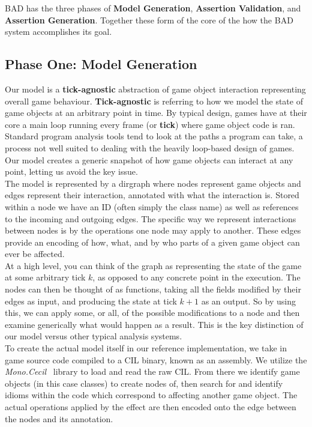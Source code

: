 \documentclass[letterpaper,twocolumn,10pt]{article}
\begin{document}
BAD has the three phases of \textbf{Model Generation}, \textbf{Assertion Validation}, and \textbf{Assertion Generation}. Together these form of the core of the how the BAD system accomplishes its goal. 

\subsection{Phase One: Model Generation}

Our model is a \textbf{tick-agnostic} abstraction of game object interaction representing overall game behaviour. \textbf{Tick-agnostic} is referring to how we model the state of game objects at an arbitrary point in time. By typical design, games have at their core a main loop running every frame (or \textbf{tick}) where game object code is ran. Standard program analysis tools tend to look at the paths a program can take, a process not well suited to dealing with the heavily loop-based design of games. Our model creates a generic snapshot of how game objects can interact at any point, letting us avoid the key issue. \\

The model is represented by a dirgraph where nodes represent game objects and edges represent their interaction, annotated with what the interaction is. Stored within a node we have an ID (often simply the class name) as well as references to the incoming and outgoing edges. The specific way we represent interactions between nodes is by the operations one node may apply to another. These edges provide an encoding of how, what, and by who parts of a given game object can ever be affected. \\

At a high level, you can think of the graph as representing the state of the game at some arbitrary tick $k$, as opposed to any concrete point in the execution. The nodes can then be thought of as functions, taking all the fields modified by their edges as input, and producing the state at tick $k + 1$ as an output. So by using this, we can apply some, or all, of the possible modifications to a node and then examine generically what would happen as a result. This is the key distinction of our model versus other typical analysis systems. \\

To create the actual model itself in our reference implementation, we take in game source code compiled to a CIL binary, known as an assembly. We utilize the \textit{Mono.Cecil}~\cite{Mono.Cecil} library to load and read the raw CIL. From there we identify game objects (in this case classes) to create nodes of, then search for and identify idioms within the code which correspond to affecting another game object. The actual operations applied by the effect are then encoded onto the edge between the nodes and its annotation. \\
\end{document}
